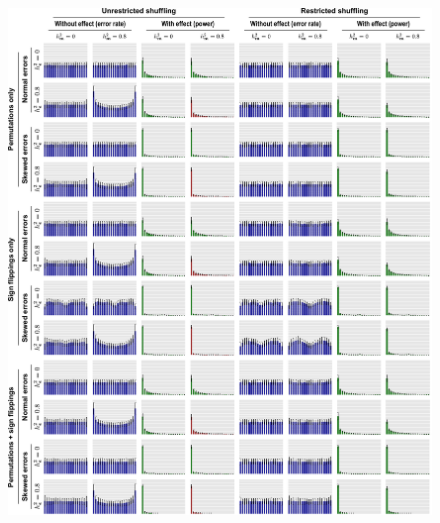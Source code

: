 \begin{figure}[!tp]
\centering
\hspace*{-5mm}\includegraphics[width=\textwidth]{figures/errorrates.pdf}
\label{fig:errorrates_noref}
\end{figure}

